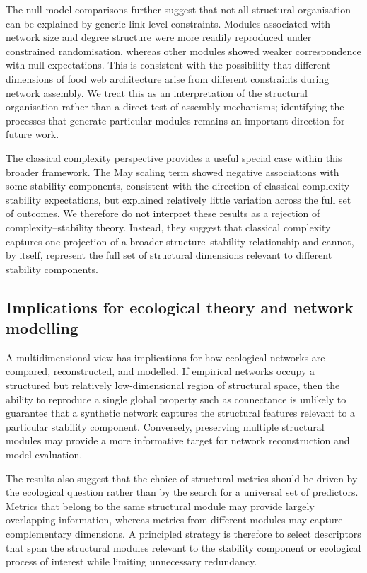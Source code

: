 \documentclass[
]{article}
\begin{document}
The null-model comparisons further suggest that not all structural
organisation can be explained by generic link-level constraints. Modules
associated with network size and degree structure were more readily
reproduced under constrained randomisation, whereas other modules showed
weaker correspondence with null expectations. This is consistent with
the possibility that different dimensions of food web architecture arise
from different constraints during network assembly. We treat this as an
interpretation of the structural organisation rather than a direct test
of assembly mechanisms; identifying the processes that generate
particular modules remains an important direction for future work.

The classical complexity perspective provides a useful special case
within this broader framework. The May scaling term showed negative
associations with some stability components, consistent with the
direction of classical complexity--stability expectations, but explained
relatively little variation across the full set of outcomes. We
therefore do not interpret these results as a rejection of
complexity--stability theory. Instead, they suggest that classical
complexity captures one projection of a broader structure--stability
relationship and cannot, by itself, represent the full set of structural
dimensions relevant to different stability components.

\subsection{Implications for ecological theory and network
modelling}\label{implications-for-ecological-theory-and-network-modelling}

A multidimensional view has implications for how ecological networks are
compared, reconstructed, and modelled. If empirical networks occupy a
structured but relatively low-dimensional region of structural space,
then the ability to reproduce a single global property such as
connectance is unlikely to guarantee that a synthetic network captures
the structural features relevant to a particular stability component.
Conversely, preserving multiple structural modules may provide a more
informative target for network reconstruction and model evaluation.

The results also suggest that the choice of structural metrics should be
driven by the ecological question rather than by the search for a
universal set of predictors. Metrics that belong to the same structural
module may provide largely overlapping information, whereas metrics from
different modules may capture complementary dimensions. A principled
strategy is therefore to select descriptors that span the structural
modules relevant to the stability component or ecological process of
interest while limiting unnecessary redundancy.
\end{document}
